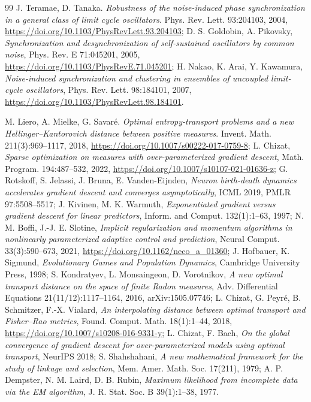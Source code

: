 \begin{thebibliography}{99}
J. Teramae, D. Tanaka.
\emph{Robustness of the noise-induced phase synchronization in a general class of limit cycle oscillators}.
Phys. Rev. Lett. 93:204103, 2004, \url{https://doi.org/10.1103/PhysRevLett.93.204103};
D. S. Goldobin, A. Pikovsky, \emph{Synchronization and desynchronization of self-sustained oscillators by common
noise}, Phys. Rev. E 71:045201, 2005, \url{https://doi.org/10.1103/PhysRevE.71.045201};
H. Nakao, K. Arai, Y. Kawamura, \emph{Noise-induced synchronization and clustering in ensembles of uncoupled
limit-cycle oscillators}, Phys. Rev. Lett. 98:184101, 2007, \url{https://doi.org/10.1103/PhysRevLett.98.184101}.

M. Liero, A. Mielke, G. Savar\'e.
\emph{Optimal entropy-transport problems and a new Hellinger--Kantorovich distance between positive measures}.
Invent. Math. 211(3):969--1117, 2018, \url{https://doi.org/10.1007/s00222-017-0759-8};
L. Chizat, \emph{Sparse optimization on measures with over-parameterized gradient descent}, Math. Program.
194:487--532, 2022, \url{https://doi.org/10.1007/s10107-021-01636-z};
G. Rotskoff, S. Jelassi, J. Bruna, E. Vanden-Eijnden, \emph{Neuron birth-death dynamics accelerates gradient descent
and converges asymptotically}, ICML 2019, PMLR 97:5508--5517;
J. Kivinen, M. K. Warmuth, \emph{Exponentiated gradient versus gradient descent for linear predictors}, Inform. and
Comput. 132(1):1--63, 1997;
N. M. Boffi, J.-J. E. Slotine, \emph{Implicit regularization and momentum algorithms in nonlinearly parameterized
adaptive control and prediction}, Neural Comput. 33(3):590--673, 2021,
\url{https://doi.org/10.1162/neco_a_01360};
J. Hofbauer, K. Sigmund, \emph{Evolutionary Games and Population Dynamics}, Cambridge University Press, 1998;
S. Kondratyev, L. Monsaingeon, D. Vorotnikov, \emph{A new optimal transport distance on the space of finite Radon
measures}, Adv. Differential Equations 21(11/12):1117--1164, 2016, arXiv:1505.07746;
L. Chizat, G. Peyr\'e, B. Schmitzer, F.-X. Vialard, \emph{An interpolating distance between optimal transport and
Fisher--Rao metrics}, Found. Comput. Math. 18(1):1--44, 2018, \url{https://doi.org/10.1007/s10208-016-9331-y};
L. Chizat, F. Bach, \emph{On the global convergence of gradient descent for over-parameterized models using optimal
transport}, NeurIPS 2018;
S. Shahshahani, \emph{A new mathematical framework for the study of linkage and selection}, Mem. Amer. Math. Soc.
17(211), 1979;
A. P. Dempster, N. M. Laird, D. B. Rubin, \emph{Maximum likelihood from incomplete data via the EM algorithm}, J. R.
Stat. Soc. B 39(1):1--38, 1977.


\end{thebibliography}
